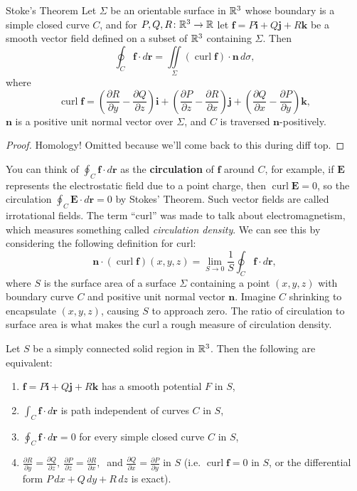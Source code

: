 \begin{namedthm}{Stoke's Theorem}
    Let $\Sigma$ be an orientable surface in $\mathbb{R}^3$ whose boundary is a simple closed curve $C$, and for $P,Q,R \colon \mathbb{R}^3 \to \mathbb{R}$ let $\mathbf f = P\mathbf i+Q\mathbf j+R\mathbf k$ be a smooth vector field defined on a subset of $\mathbb{R}^3$ containing $\Sigma$. Then \[
        \oint_C \mathbf f\cdot d\mathbf r=\iint\limits_{\Sigma}(\operatorname{curl}\mathbf f)\cdot \mathbf n \, d\sigma,
    \] where \[
    \operatorname{curl}\mathbf f=\left( \frac{\partial R}{\partial y}-\frac{\partial Q}{\partial z} \right) \mathbf i + \left( \frac{\partial P}{\partial z}-\frac{\partial R}{\partial x} \right) \mathbf j+\left( \frac{\partial Q}{\partial x}-\frac{\partial P}{\partial y} \right) \mathbf k,
    \] $\mathbf n$ is a positive unit normal vector over $\Sigma$, and $C$ is traversed $\mathbf n$-positively.
\end{namedthm}
\begin{proof}
    Homology! Omitted because we'll come back to this during diff top.
\end{proof}
You can think of $\oint_C \mathbf f\cdot d\mathbf r$ as the \textbf{circulation} of $\mathbf f$ around $C$, for example, if $\mathbf E$ represents the electrostatic field due to a point charge, then $\operatorname{curl}\mathbf E=0$, so the circulation $\oint_C \mathbf E\cdot d\mathbf r=0$ by Stokes' Theorem. Such vector fields are called irrotational fields. The term ``curl'' was made to talk about electromagnetism, which measures something called \emph{circulation density}. We can see this by considering the following definition for curl: \[
    \mathbf n\cdot (\operatorname{curl}\mathbf f)(x,y,z)=\lim_{S\to 0}\frac{1}{S}\oint_C \mathbf f\cdot d\mathbf r,
\] where $S$ is the surface area of a surface $\Sigma$ containing a point $(x,y,z)$ with boundary curve $C$ and positive unit normal vector $\mathbf n$. Imagine $C$ shrinking to encapsulate $(x,y,z)$, causing $S$ to approach zero. The ratio of circulation to surface area is what makes the curl a rough measure of circulation density.
\begin{theorem}
    Let $S$ be a simply connected solid region in $\mathbb{R}^3$. Then the following are equivalent:
    \begin{enumerate}[label=(\alph*)]
        \item $\mathbf f=P\mathbf i+Q\mathbf j+R\mathbf k$ has a smooth potential $F$ in $S$,
        \item $\int_C \mathbf f\cdot d\mathbf r$ is path independent of curves $C$ in $S$, 
        \item $\oint_C \mathbf f\cdot d\mathbf r=0$ for every simple closed curve $C$ in $S$,
        \item $\frac{\partial R}{\partial y}=\frac{\partial Q}{\partial z}, \ \frac{\partial P}{\partial z}= \frac{\partial R}{\partial x}, \ $ and $\frac{\partial Q}{\partial x}=\frac{\partial P}{\partial y}$ in $S$ (i.e. $\operatorname{curl}\mathbf f=0$ in $S$, or the differential form $P \,dx+Q\,dy+R\,dz$ is exact).
    \end{enumerate}
\end{theorem}
